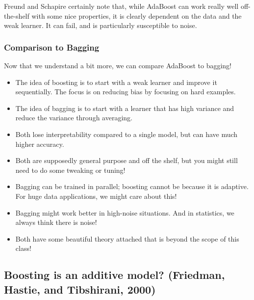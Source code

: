 Freund and Schapire certainly note that, while AdaBoost can work really well off-the-shelf with some nice properties, it is clearly dependent on the data and the weak learner. It can fail, and is particularly susceptible to noise. 

\subsubsection{Comparison to Bagging}

Now that we understand a bit more, we can compare AdaBoost to bagging!
\begin{itemize}
\item The idea of boosting is to start with a weak learner and improve it sequentially. The focus is on reducing bias by focusing on hard examples. 
\item The idea of bagging is to start with a learner that has high variance and reduce the variance through averaging. 
\item Both lose interpretability compared to a single model, but can have much higher accuracy.
\item Both are supposedly general purpose and off the shelf, but you might still need to do some tweaking or tuning!
\item Bagging can be trained in parallel; boosting cannot be because it is adaptive. For huge data applications, we might care about this!
\item Bagging might work better in high-noise situations. And in statistics, we always think there is noise!
\item Both have some beautiful theory attached that is beyond the scope of this class!
\end{itemize}

\subsection{Boosting is an additive model? (Friedman, Hastie, and Tibshirani, 2000)}

